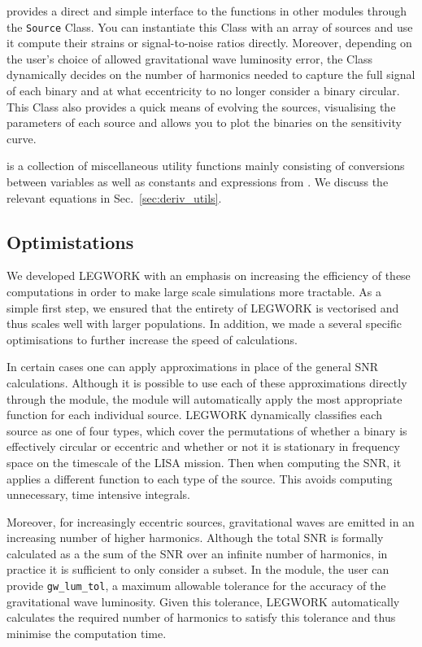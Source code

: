 \documentclass[twocolumn]{aastex63}
\newcommand{\lw}{LEGWORK}
\newcommand{\lwColour}{SeaGreen}
\newcommand{\lwModLink}[1]{\href{https://legwork.readthedocs.io/en/latest/modules.html\#module-legwork.#1}{\color{\lwColour}{\texttt{#1}}}}
\begin{document}
\lwModLink{source} provides a direct and simple interface to the functions in other modules through the \texttt{Source} Class. You can instantiate this Class with an array of sources and use it compute their strains or signal-to-noise ratios directly. Moreover, depending on the user's choice of allowed gravitational wave luminosity error, the Class dynamically decides on the number of harmonics needed to capture the full signal of each binary and at what eccentricity to no longer consider a binary circular. This Class also provides a quick means of evolving the sources, visualising the parameters of each source and allows you to plot the binaries on the sensitivity curve.

\lwModLink{utils} is a collection of miscellaneous utility functions mainly consisting of conversions between variables as well as constants and expressions from \citet{Peters+1964}. We discuss the relevant equations in Sec.~\ref{sec:deriv_utils}.

\subsection{Optimistations}

We developed \lw{} with an emphasis on increasing the efficiency of these computations in order to make large scale simulations more tractable. As a simple first step, we ensured that the entirety of \lw{} is vectorised and thus scales well with larger populations. In addition, we made a several specific optimisations to further increase the speed of calculations.

In certain cases one can apply approximations in place of the general SNR calculations. Although it is possible to use each of these approximations directly through the \lwModLink{snr} module, the \lwModLink{source} module will automatically apply the most appropriate function for each individual source. \lw{} dynamically classifies each source as one of four types, which cover the permutations of whether a binary is effectively circular or eccentric and whether or not it is stationary in frequency space on the timescale of the LISA mission. Then when computing the SNR, it applies a different function to each type of the source. This avoids computing unnecessary, time intensive integrals.

Moreover, for increasingly eccentric sources, gravitational waves are emitted in an increasing number of higher harmonics. Although the total SNR is formally calculated as a the sum of the SNR over an infinite number of harmonics, in practice it is sufficient to only consider a subset. In the \lwModLink{source} module, the user can provide \texttt{gw\_lum\_tol}, a maximum allowable tolerance for the accuracy of the gravitational wave luminosity. Given this tolerance, \lw{} automatically calculates the required number of harmonics to satisfy this tolerance and thus minimise the computation time.
\end{document}
